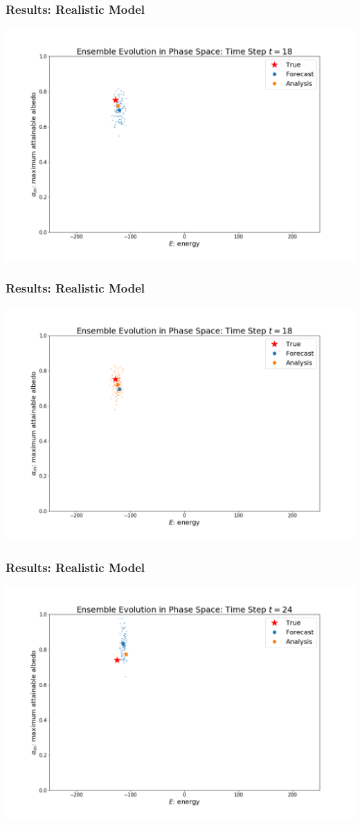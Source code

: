 \documentclass{beamer}
\begin{document}
\begin{frame}
\frametitle{Results: Realistic Model}
\centering
\includegraphics[width=\linewidth]{Figures/EnsembleEvolution_forecast_t=18.png}
\end{frame}
\begin{frame}
\frametitle{Results: Realistic Model}
\centering
\includegraphics[width=\linewidth]{Figures/EnsembleEvolution_analysis_t=18.png}
\end{frame}
\begin{frame}
\frametitle{Results: Realistic Model}
\centering
\includegraphics[width=\linewidth]{Figures/EnsembleEvolution_forecast_t=24.png}
\end{frame}
\end{document}
